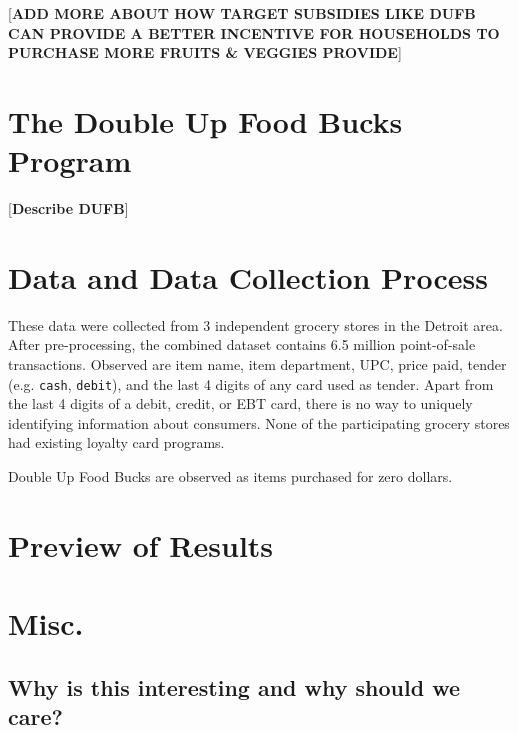 \documentclass[11pt,letterpaper,]{book}
\begin{document}
{[}\textbf{ADD MORE ABOUT HOW TARGET SUBSIDIES LIKE DUFB CAN PROVIDE A
BETTER INCENTIVE FOR HOUSEHOLDS TO PURCHASE MORE FRUITS \& VEGGIES
PROVIDE}{]}

\section{The Double Up Food Bucks
Program}\label{the-double-up-food-bucks-program}

{[}\textbf{Describe DUFB}{]}

\section{Data and Data Collection
Process}\label{data-and-data-collection-process}

These data were collected from 3 independent grocery stores in the
Detroit area. After pre-processing, the combined dataset contains 6.5
million point-of-sale transactions. Observed are item name, item
department, UPC, price paid, tender (e.g. \texttt{cash},
\texttt{debit}), and the last 4 digits of any card used as tender. Apart
from the last 4 digits of a debit, credit, or EBT card, there is no way
to uniquely identifying information about consumers. None of the
participating grocery stores had existing loyalty card programs.

Double Up Food Bucks are observed as items purchased for zero dollars.

\section{Preview of Results}\label{preview-of-results}

\section{Misc.}\label{misc.}

\subsection{Why is this interesting and why should we
care?}\label{why-is-this-interesting-and-why-should-we-care}
\end{document}
